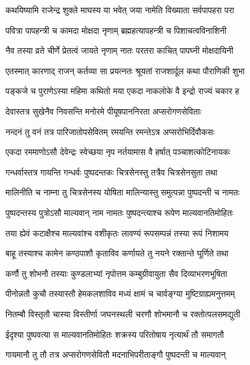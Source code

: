 
\twolineshloka
{कथयिष्यामि राजेन्द्र शुक्ले माघस्य या भवेत्}
{जया नामेति विख्याता सर्वपापहरा परा}%

\twolineshloka
{पवित्रा पापहन्त्री च कामदा मोक्षदा नृणाम्}
{ब्रह्महत्यापहन्त्री च पिशाचत्वविनाशिनी}%

\twolineshloka
{नैव तस्या व्रते चीर्णे प्रेतत्वं जायते नृणाम्}
{नातः परतरा काचित् पापघ्नी मोक्षदायिनी}%

\twolineshloka
{एतस्मात् कारणाद् राजन् कर्तव्या सा प्रयत्नतः}
{श्रूयतां राजशार्दूल कथा पौराणिकी शुभा}%

\twolineshloka
{पङ्कजे च पुराणेऽस्या महिमा कथितो मया}
{एकदा नाकलोके वै इन्द्रो राज्यं चकार ह}%

\twolineshloka
{देवास्तत्र सुखेनैव निवसन्ति मनोरमे}
{पीयूषपाननिरता अप्सरोगणसेविताः}%

\twolineshloka
{नन्दनं तु वनं तत्र पारिजातोपसेवितम्}
{रमयन्ति रमन्तेऽत्र अप्सरोभिर्दिवौकसः}%

\twolineshloka
{एकदा रममाणोऽसौ देवेन्द्रः स्वेच्छया नृप}
{नर्तयामास वै हर्षात् पञ्चाशत्कोटिनायकः}%

\twolineshloka
{गन्धर्वास्तत्र गायन्ति गन्धर्वः पुष्पदन्तकः}
{चित्रसेनस्तु तत्रैव चित्रसेनसुता तथा}%

\twolineshloka
{मालिनीति च नाम्ना तु चित्रसेनस्य योषिता}
{मालिन्यास्तु समुत्पन्ना पुष्पदन्ती च नामतः}%

\twolineshloka
{पुष्पदन्तस्य पुत्रोऽसौ माल्यवान् नाम नामतः}
{पुष्पदन्त्याश्च रूपेण माल्यवानतिमोहितः}%

\twolineshloka
{तया ह्येवं कटाक्षैश्च माल्यवांश्च वशीकृतः}
{लावण्यं रूपसम्पन्नं तस्या रूपं निशामय}%

\twolineshloka
{बाहू तस्याश्च कामेन कण्ठपाशौ कृताविव}
{कर्णायते तु नयने रक्तान्ते घूर्णिते तथा}%

\twolineshloka
{कर्णौ तु शोभनौ तस्याः कुण्डलाभ्यां नृपोत्तम}
{कम्बुग्रीवायुता सैव दिव्याभरणभूषिता}%

\twolineshloka
{पीनोन्नतौ कुचौ तस्यास्तौ हेमकलशाविव}
{मध्यं क्षामं च चार्वङ्ग्या मुष्टिग्राह्यमनुत्तमम्}%

\twolineshloka
{नितम्बौ विस्तृतौ चास्या विस्तीर्णा जघनस्थली}
{चरणौ शोभमानौ च रक्तोत्पलसमद्युती}%

\twolineshloka
{ईदृश्या पुष्पवत्या स माल्यवानतिमोहितः}
{शक्रस्य परितोषाय नृत्यार्थं तौ समागतौ}%

\twolineshloka
{गायमानौ तु तौ तत्र अप्सरोगणसेवितौ}
{मदनाभिपरीताङ्गौ पुष्पदन्ती च माल्यवान्}%

